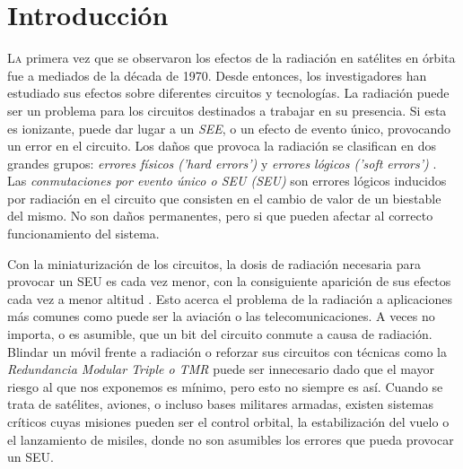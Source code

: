 \chapter{Introducción}
\label{ch:Introduccion}

\lettrine[lraise=-0.1, lines=2, loversize=0.2]{L}{a} primera vez que se observaron
los efectos de la radiación en satélites en órbita fue a mediados de la década de
1970. Desde entonces, los investigadores han estudiado sus efectos sobre
diferentes circuitos y tecnologías. La radiación puede ser un problema para los
circuitos destinados a trabajar en su presencia. Si esta es ionizante, puede dar
lugar a un \textit{\gls{SEE}}, o un efecto de evento único, provocando un error 
en el circuito. Los daños que provoca la radiación se clasifican en dos grandes 
grupos: \textit{errores físicos ('hard errors')} y \textit{errores lógicos ('soft
errors')} \cite{TesisPoli}. Las \textit{conmutaciones por evento único o 
\acrlong{SEU} (\acrshort{SEU})} son errores lógicos inducidos por radiación en el 
circuito que consisten en el cambio de valor de un biestable del mismo. No son 
daños permanentes, pero si que pueden afectar al correcto funcionamiento del 
sistema.

Con la miniaturización de los circuitos, la dosis de radiación necesaria para 
provocar un \gls{SEU} es cada vez menor, con la consiguiente aparición de sus 
efectos cada vez a menor altitud \cite{EDN}. Esto acerca el problema de la 
radiación a aplicaciones más comunes como puede ser la aviación o las 
telecomunicaciones. A veces no importa, o es asumible, que un bit del circuito 
conmute a causa de radiación. Blindar un móvil frente a radiación o reforzar sus
circuitos con técnicas como la \textit{Redundancia Modular Triple o \gls{TMR}}
\cite{TMR} puede ser innecesario dado que el mayor riesgo al que nos exponemos es 
mínimo, pero esto no siempre es así. Cuando se trata de satélites, aviones, o 
incluso bases militares armadas, existen sistemas críticos cuyas misiones pueden 
ser el control orbital, la estabilización del vuelo o el lanzamiento de misiles, 
donde no son asumibles los errores que pueda provocar un \gls{SEU}.

